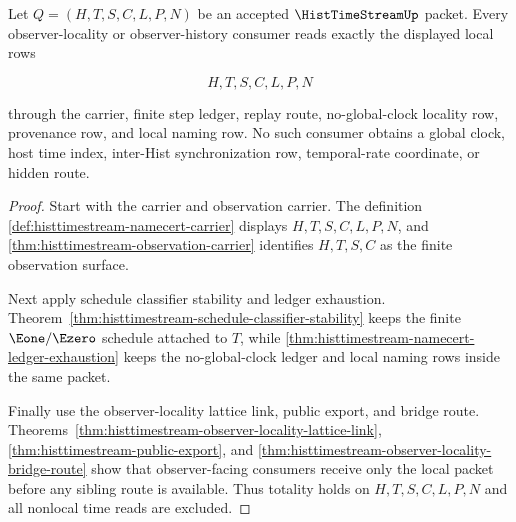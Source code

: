 \begin{theorem}
\label{thm:hist-time-stream-observer-locality-totality}
Let $Q=(H,T,S,C,L,P,N)$ be an accepted $\HistTimeStreamUp$ packet. Every observer-locality or observer-history consumer reads exactly the displayed local rows

$$
H,T,S,C,L,P,N
$$

through the carrier, finite step ledger, replay route, no-global-clock locality row, provenance row, and local naming row. No such consumer obtains a global clock, host time index, inter-Hist synchronization row, temporal-rate coordinate, or hidden route.
\end{theorem}
\begin{proof}
Start with the carrier and observation carrier. The definition \autoref{def:histtimestream-namecert-carrier} displays $H,T,S,C,L,P,N$, and \autoref{thm:histtimestream-observation-carrier} identifies $H,T,S,C$ as the finite observation surface.

Next apply schedule classifier stability and ledger exhaustion. Theorem~\ref{thm:histtimestream-schedule-classifier-stability} keeps the finite $\Eone/\Ezero$ schedule attached to $T$, while \autoref{thm:histtimestream-namecert-ledger-exhaustion} keeps the no-global-clock ledger and local naming rows inside the same packet.

Finally use the observer-locality lattice link, public export, and bridge route. Theorems~\ref{thm:histtimestream-observer-locality-lattice-link}, \ref{thm:histtimestream-public-export}, and \ref{thm:histtimestream-observer-locality-bridge-route} show that observer-facing consumers receive only the local packet before any sibling route is available. Thus totality holds on $H,T,S,C,L,P,N$ and all nonlocal time reads are excluded.
\end{proof}

